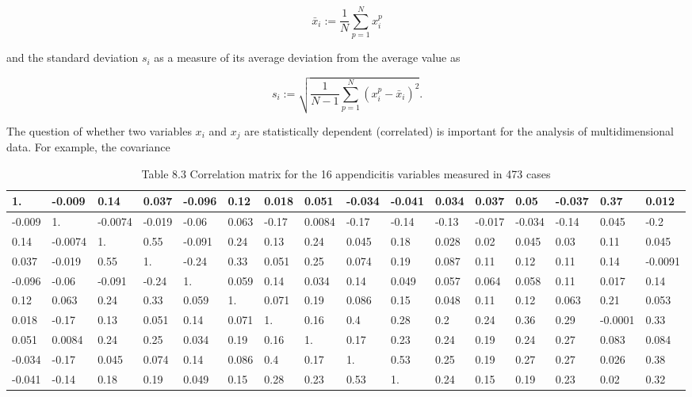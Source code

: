 \documentclass[10pt]{book}
\begin{document}
$$
\bar{x}_{i}:=\frac{1}{N} \sum_{p=1}^{N} x_{i}^{p}
$$

and the standard deviation $s_{i}$ as a measure of its average deviation from the average value as

$$
s_{i}:=\sqrt{\frac{1}{N-1} \sum_{p=1}^{N}\left(x_{i}^{p}-\bar{x}_{i}\right)^{2}} .
$$

The question of whether two variables $x_{i}$ and $x_{j}$ are statistically dependent (correlated) is important for the analysis of multidimensional data. For example, the covariance

\begin{table}[htbp]
\begin{center}
\captionsetup{labelformat=empty}
\caption{Table 8.3 Correlation matrix for the 16 appendicitis variables measured in 473 cases}
\begin{tabular}{|l|l|l|l|l|l|l|l|l|l|l|l|l|l|l|l|}
\hline
1. & -0.009 & 0.14 & 0.037 & -0.096 & 0.12 & 0.018 & 0.051 & -0.034 & -0.041 & 0.034 & 0.037 & 0.05 & -0.037 & 0.37 & 0.012 \\
\hline
-0.009 & 1. & -0.0074 & -0.019 & -0.06 & 0.063 & -0.17 & 0.0084 & -0.17 & -0.14 & -0.13 & -0.017 & -0.034 & -0.14 & 0.045 & -0.2 \\
\hline
0.14 & -0.0074 & 1. & 0.55 & -0.091 & 0.24 & 0.13 & 0.24 & 0.045 & 0.18 & 0.028 & 0.02 & 0.045 & 0.03 & 0.11 & 0.045 \\
\hline
0.037 & -0.019 & 0.55 & 1. & -0.24 & 0.33 & 0.051 & 0.25 & 0.074 & 0.19 & 0.087 & 0.11 & 0.12 & 0.11 & 0.14 & -0.0091 \\
\hline
-0.096 & -0.06 & -0.091 & -0.24 & 1. & 0.059 & 0.14 & 0.034 & 0.14 & 0.049 & 0.057 & 0.064 & 0.058 & 0.11 & 0.017 & 0.14 \\
\hline
0.12 & 0.063 & 0.24 & 0.33 & 0.059 & 1. & 0.071 & 0.19 & 0.086 & 0.15 & 0.048 & 0.11 & 0.12 & 0.063 & 0.21 & 0.053 \\
\hline
0.018 & -0.17 & 0.13 & 0.051 & 0.14 & 0.071 & 1. & 0.16 & 0.4 & 0.28 & 0.2 & 0.24 & 0.36 & 0.29 & -0.0001 & 0.33 \\
\hline
0.051 & 0.0084 & 0.24 & 0.25 & 0.034 & 0.19 & 0.16 & 1. & 0.17 & 0.23 & 0.24 & 0.19 & 0.24 & 0.27 & 0.083 & 0.084 \\
\hline
-0.034 & -0.17 & 0.045 & 0.074 & 0.14 & 0.086 & 0.4 & 0.17 & 1. & 0.53 & 0.25 & 0.19 & 0.27 & 0.27 & 0.026 & 0.38 \\
\hline
-0.041 & -0.14 & 0.18 & 0.19 & 0.049 & 0.15 & 0.28 & 0.23 & 0.53 & 1. & 0.24 & 0.15 & 0.19 & 0.23 & 0.02 & 0.32 \\

\end{tabular}
\end{center}
\end{table}
\end{document}
